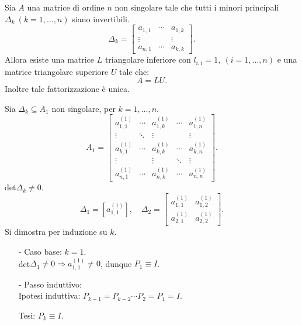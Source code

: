 \begin{teo}
\label{teo4.4}
Sia $A$ una matrice di ordine $n$ non singolare tale che tutti i minori
principali $\Delta_k \ (k = 1, \ldots, n)$ siano invertibili.
\[\Delta_k = \left[
\begin{array}{ccc}
a_{1,1}&\cdots&a_{1,k}\\
\vdots& & \vdots \\
a_{n,1}&\cdots&a_{k,k}
\end{array}\right].\]
Allora esiste una matrice $L$ triangolare inferiore con $l_{i,i} = 1, \ (i =
1, \ldots, n)$ e una matrice triangolare superiore $U$ tale che:
\[A = LU.\]
Inoltre tale fattorizzazione è unica.
\end{teo}
\begin{dimo}Sia $\Delta_k \subseteq A_1$ non singolare, per $k = 1, \ldots, n$.
\[
A_1 = \left[
\begin{array}{ccccc}
a_{1,1}^{(1)} & \cdots & a_{1,k}^{(1)}  & \cdots   & a_{1,n}^{(1)}\\
\vdots      & \ddots &   \vdots     &          & \vdots     \\
a_{k,1}^{(1)} & \cdots & a_{k,k}^{(1)}  & \cdots   & a_{k,n}^{(1)}\\
\vdots      &        & \vdots       & \ddots   & \vdots     \\
a_{n,1}^{(1)} & \cdots & a_{n,k}^{(1)}  & \cdots   & a_{n,n}^{(1)}
\end{array} \right].
\]
det$\Delta_k \neq 0$.
\[\Delta_1 = [a_{1,1}^{(1)}], \quad \Delta_2 = \left[\begin{array}{cc}
a_{1,1}^{(1)} & a_{1,2}^{(1)}\\
a_{2,1}^{(1)} & a_{2,2}^{(1)}
\end{array}\right].\]
Si dimostra per induzione su $k$.
\begin{itemize}
\item[-]Caso base: $k = 1$.\\

det$\Delta_1 \neq 0 \Rightarrow a_{1,1}^{(1)} \neq 0$, dunque $P_1 \equiv I$.

\item[-]Passo induttivo:\\
Ipotesi induttiva: $P_{k-1} = P_{k-2}\cdots P_{2} = P_1 = I$.

Tesi: $P_k \equiv I$.


\end{itemize}
\end{dimo}
